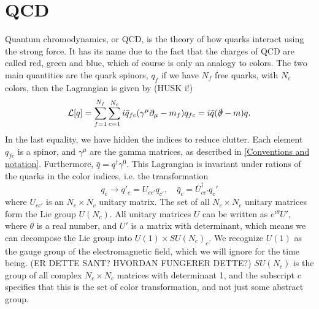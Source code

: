 \section{QCD}

Quantum chromodynamics, or QCD, is the theory of how quarks interact using the strong force.
It has its name due to the fact that the charges of QCD are called red, green and blue, which of course is only an analogy to colors.
The two main quantities are the quark spinors, $q_f$
if we have $N_f$ free quarks, with $N_c$ colors, then the Lagrangian is given by (HUSK i!)
\begin{equation}
    \mathcal{L}[q] = \sum_{f=1}^{N_f} \sum_{c = 1}^{N_c} i \bar q_{fc} (\gamma^\mu \partial_\mu - m_f )q_{fc}
    = i  \bar q (\slashed{\partial } - m)q.
\end{equation}
In the last equality, we have hidden the indices to reduce clutter.
Each element $q_{fc}$ is a spinor, and $\gamma^\mu$ are the gamma matrices, as described in \autoref{Conventions and notation}.
Furthermore, $\bar q = q^\dagger \gamma^0$.
This Lagrangian is invariant under rations of the quarks in the color indices,
i.e. the transformation
\begin{equation}
    q_c \rightarrow q'_c = U_{cc'} q_{c'},
    \quad 
    \bar q_c = \bar U_{cc'}^\dagger q_c'
\end{equation}
where $U_{cc'}$ is an $N_c \times N_c$ unitary matrix.
The set of all $N_c\times N_c$ unitary matrices form the Lie group $U(N_c)$.
All unitary matrices $U$ can be written as $e^{i\theta} U'$, where $\theta$ is a real number, and $U'$ is a matrix with determinant, which means we can decompose the Lie group into $U(1)\times SU(N_c)_c$.
We recognize $U(1)$ as the gauge group of the electromagnetic field, which we will ignore for the time being. (ER DETTE SANT? HVORDAN FUNGERER DETTE?)
$SU(N_c)$ is the group of all complex $N_c\times N_c$ matrices with determinant 1, and the subscript $c$ specifies that this is the set of color transformation, and not just some abstract group.

